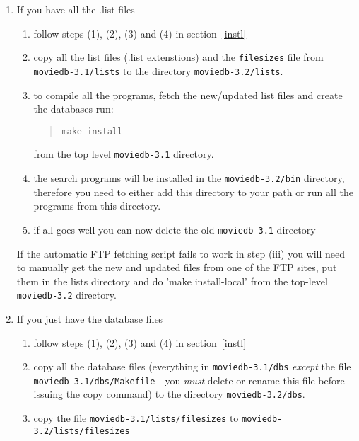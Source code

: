 \begin{enumerate}
\item If you have all the .list files

\renewcommand{\theenumii}{\roman{enumii}}
\begin{enumerate}
\item follow steps (1), (2), (3) and (4) in section~\ref{instl}

\item copy all the list files (.list extenstions) and the {\tt filesizes} file
from {\tt moviedb-3.1/lists} to the directory {\tt moviedb-3.2/lists}. 

\item to compile all the programs, fetch the new/updated list files and create 
       the databases run:
\begin{quote}
{\tt make install}
\end{quote}
       from the top level {\tt moviedb-3.1} directory.
\item the search programs will be installed in the {\tt moviedb-3.2/bin} directory,
       therefore you need to either add this directory to your path or run
       all the programs from this directory.
       
\item if all goes well you can now delete the old {\tt moviedb-3.1} directory

\end{enumerate}

If the automatic FTP fetching script fails to work in step (iii) you will need
to manually get the new and updated files from one of the FTP sites, put
them in the lists directory and do 'make install-local' from the top-level
{\tt moviedb-3.2} directory.

\item If you just have the database files
\renewcommand{\theenumii}{\roman{enumii}}
\begin{enumerate}
\item follow steps (1), (2), (3) and (4) in section~\ref{instl}

\item copy all the database files (everything in {\tt moviedb-3.1/dbs} 
{\em except} the
       file {\tt moviedb-3.1/dbs/Makefile} - you {\em must} delete or rename this file 
       before issuing the copy command) to the directory {\tt moviedb-3.2/dbs}.
       
       
\item copy the file {\tt moviedb-3.1/lists/filesizes} to {\tt moviedb-3.2/lists/filesizes}


\end{enumerate}
\end{enumerate}
